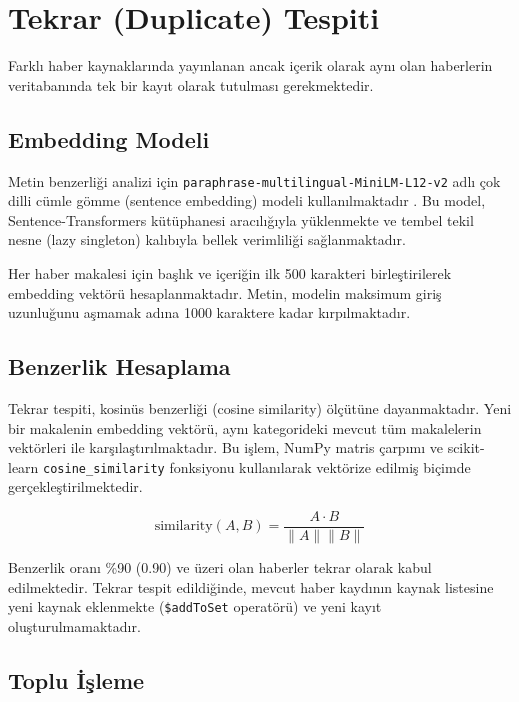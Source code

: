 \documentclass[conference]{IEEEtran}
\begin{document}
\section{Tekrar (Duplicate) Tespiti}
\label{sec:duplicate}

Farklı haber kaynaklarında yayınlanan ancak içerik olarak aynı olan haberlerin veritabanında tek bir kayıt olarak tutulması gerekmektedir.

\subsection{Embedding Modeli}

Metin benzerliği analizi için \texttt{paraphrase-multilingual-MiniLM-L12-v2} adlı çok dilli cümle gömme (sentence embedding) modeli kullanılmaktadır \cite{reimers2019}. Bu model, Sentence-Transformers kütüphanesi aracılığıyla yüklenmekte ve tembel tekil nesne (lazy singleton) kalıbıyla bellek verimliliği sağlanmaktadır.

Her haber makalesi için başlık ve içeriğin ilk 500 karakteri birleştirilerek embedding vektörü hesaplanmaktadır. Metin, modelin maksimum giriş uzunluğunu aşmamak adına 1000 karaktere kadar kırpılmaktadır.

\subsection{Benzerlik Hesaplama}

Tekrar tespiti, kosinüs benzerliği (cosine similarity) ölçütüne dayanmaktadır. Yeni bir makalenin embedding vektörü, aynı kategorideki mevcut tüm makalelerin vektörleri ile karşılaştırılmaktadır. Bu işlem, NumPy matris çarpımı ve scikit-learn \texttt{cosine\_similarity} fonksiyonu kullanılarak vektörize edilmiş biçimde gerçekleştirilmektedir.

\begin{equation}
\text{similarity}(A, B) = \frac{A \cdot B}{\|A\| \|B\|}
\label{eq:cosine}
\end{equation}

Benzerlik oranı \%90 (0.90) ve üzeri olan haberler tekrar olarak kabul edilmektedir. Tekrar tespit edildiğinde, mevcut haber kaydının kaynak listesine yeni kaynak eklenmekte (\texttt{\$addToSet} operatörü) ve yeni kayıt oluşturulmamaktadır.

\subsection{Toplu İşleme}
\end{document}
